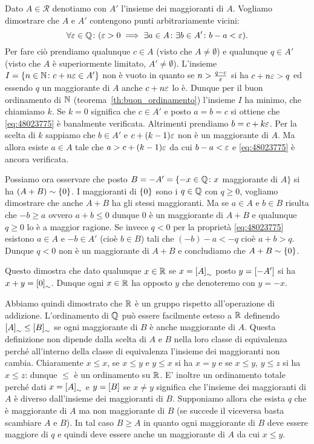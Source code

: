 Dato $A\in \mathcal R$ denotiamo con $A'$ l'insieme dei maggioranti di $A$.
Vogliamo dimostrare che $A$ e $A'$ contengono punti arbitrariamente vicini:
\begin{equation}\label{eq:48023775}
\forall \varepsilon\in{\mathbb Q}\colon (\varepsilon >0 \implies \exists a \in A\colon \exists b\in A'\colon
b-a < \varepsilon).
\end{equation}
Per fare ciò prendiamo qualunque $c\in A$ (visto che $A\neq \emptyset$)
e qualunque $q\in A'$ (visto che $A$ è superiormente limitato, $A'\neq \emptyset$).
L'insieme $I={\left\{ n\in {\mathbb N} \colon c+n\varepsilon\in A' \right\}}$
non è vuoto in quanto se $n>\frac{q-c}{\varepsilon}$ si ha $c+n\varepsilon>q$ ed essendo $q$ 
un maggiorante di $A$ anche $c+n\varepsilon$ lo è.
Dunque per il buon ordinamento di ${\mathbb N}$ (teorema~\ref{th:buon_ordinamento})
l'insieme $I$ ha minimo, che chiamiamo $k$.
Se $k=0$ significa che $c\in A'$ e posto $a=b=c$ si ottiene 
che \eqref{eq:48023775} è banalmente verificata.
Altrimenti prendiamo $b=c+k\varepsilon$.
Per la scelta di $k$ sappiamo che $b\in A'$ e $c+(k-1)\varepsilon$ non è un maggiorante di 
$A$. 
Ma allora esiste $a\in A$ tale che $a>c+(k-1)\varepsilon$ da cui 
$b-a < \varepsilon$ e \eqref{eq:48023775} è ancora verificata.

Possiamo ora osservare che posto $B=-A' = \{-x\in {\mathbb Q} \colon x$ maggiorante di $A\}$
si ha $(A+B)\sim{\left\{ 0 \right\}}$. 
I maggioranti di ${\left\{ 0 \right\}}$ sono i $q\in {\mathbb Q}$ con $q\ge 0$, 
vogliamo dimostrare che anche $A+B$ ha gli stessi maggioranti.
Ma se $a\in A$ e $b\in B$ risulta che $-b\ge a$ ovvero $a+b\le 0$ 
dunque $0$ è un maggiorante di $A+B$ e qualunque $q\ge 0$ lo è a maggior ragione.
Se invece $q<0$ per la proprietà \eqref{eq:48023775} esistono $a\in A$ 
e $-b\in A'$ (cioè $b\in B$) tali che $(-b)-a<-q$ cioè $a+b>q$. Dunque 
$q<0$ non è un maggiorante di $A+B$ e concludiamo che $A+B\sim{\left\{ 0 \right\}}$.

Questo dimostra che dato qualunque $x\in {\mathbb R}$ se $x={\left[ A \right]}_\sim$
posto $y={\left[ -A' \right]}$ si ha $x+y={\left[ 0 \right]}_\sim$.
Dunque ogni $x\in {\mathbb R}$ ha opposto $y$ che denoteremo 
con $y=-x$.

Abbiamo quindi dimostrato che ${\mathbb R}$ è un gruppo rispetto all'operazione 
di addizione. L'ordinamento di ${\mathbb Q}$ può essere facilmente esteso a ${\mathbb R}$
definendo ${\left[ A \right]}_\sim \le {\left[ B \right]}_\sim$ se ogni maggiorante di $B$ 
è anche maggiorante di $A$. Questa definizione non dipende dalla scelta 
di $A$ e $B$ nella loro classe di equivalenza perché all'interno della classe di 
equivalenza l'insieme dei maggioranti 
non cambia.
Chiaramente $x\le x$, se $x\le y$ e $y\le x$ si ha $x=y$ 
e se $x\le y$, $y\le z$ si ha $x\le z$: dunque $\le$ è un ordinamento su ${\mathbb R}$.
E' inoltre un ordinamento totale perché dati $x={\left[ A \right]}_\sim$ e 
$y={\left[ B \right]}$ se $x\neq y$ significa che l'insieme dei maggioranti 
di $A$ è diverso dall'insieme dei maggioranti di $B$. 
Supponiamo allora che esista $q$ che è maggiorante di $A$ 
ma non maggiorante di $B$ (se succede il viceversa basta scambiare $A$ e $B$).
In tal caso $B\ge A$ in quanto ogni maggiorante di $B$ deve essere maggiore 
di $q$ e quindi deve essere anche un maggiorante di $A$ da cui $x\le y$. 

